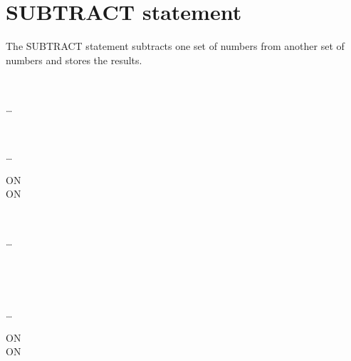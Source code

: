 \section{SUBTRACT statement}

The SUBTRACT statement subtracts one set of numbers from another set of numbers and stores the results.

\begin{syntax}
  \begin{1=}
    \identifier \\
    \literal
  \end{1=} \ldots
  \begin{1=}
    \begin{1=}
      \identifier \\
      \literal
    \end{1=}
    \begin{0-1}
    \end{0-1}
  \end{1=} \ldots

  \begin{0+}
    ON   \imperativestatement \\
     ON   \imperativestatement
  \end{0+}

  \begin{0-1}
  \end{0-1}
\end{syntax}

\begin{syntax}
  \begin{1=}
    \identifier \\
    \literal
  \end{1=} \ldots
  \begin{1=}
    \identifier \\
    \literal
  \end{1=}

  \begin{1=}
    \begin{1=}
      \identifier \\
      \literal
    \end{1=}
    \begin{0-1}
    \end{0-1}
  \end{1=} \ldots

  \begin{0+}
    ON   \imperativestatement \\
     ON   \imperativestatement
  \end{0+}

  \begin{0-1}
  \end{0-1}
\end{syntax}

